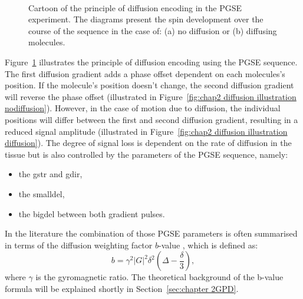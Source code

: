 \begin{figure}[phtb]
\centering
{}\\
\caption{Cartoon of the principle of diffusion encoding in the PGSE experiment. The diagrams present the spin development over the course of the sequence in the case of: (a) no diffusion or (b) diffusing molecules.}
\label{fig:chap2 diffusion illustration}
\end{figure}


Figure~\ref{fig:chap2 diffusion illustration} illustrates the principle of diffusion encoding using the PGSE sequence. The first diffusion gradient adds a phase offset dependent on each molecules's position. If the molecule's position doesn't change, the second diffusion gradient will reverse the phase offset (illustrated in Figure~\ref{fig:chap2 diffusion illustration nodiffusion}). However, in the case of motion due to diffusion, the individual positions will differ between the first and second diffusion gradient, resulting in a reduced signal amplitude	(illustrated in Figure~\ref{fig:chap2 diffusion illustration diffusion}). The degree of signal loss is dependent on the rate of diffusion in the tissue but is also controlled by the parameters of the {\gls{PGSE}} sequence, namely:

\begin{itemize}
	\item the {\gls{gstr}} and {\gls{gdir}},
	\item the {\gls{smalldel}},
	\item the {\gls{bigdel}} between both gradient pulses.
\end{itemize}

In the literature the combination of those PGSE parameters is often summarised in terms of the diffusion weighting factor $b$-value \citep{LeBihan:1986}, which is defined as:
\begin{equation}
	b = \gamma^2|G|^2\delta^2(\Delta-\frac{\delta}{3}),
    \label{eq:bvalue}
\end{equation}
where $\gamma$ is the gyromagnetic ratio. The theoretical background of the b-value formula will be explained shortly in Section~\ref{sec:chapter 2GPD}.

